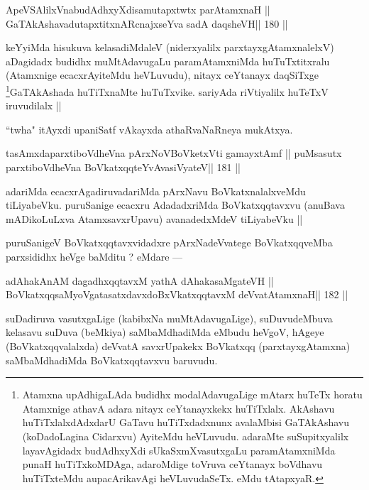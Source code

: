 \begin{shl}
ApeVSAlilxVnabudAdhxyXdisamutapxtwtx parAtamxnaH ||
GaTAkAshavadutapxtitxnARcnajxseYva sadA daqsheVH\hfill || 180 ||
\end{shl}

\begin{artha}
keYyiMda hisukuva kelasadiMdaleV (niderxyalilx parxtayxgAtamxnalelxV) 
aDagidadx budidhx muMtAdavugaLu paramAtamxniMda huTuTxtitxralu 
(Atamxnige ecacxrAyiteMdu heVLuvudu), nitayx ceYtanayx daqSiTxge 
\footnote[12]{Atamxna upAdhigaLAda budidhx modalAdavugaLige mAtarx 
huTeTx horatu Atamxnige athavA adara nitayx ceYtanayxkekx huTiTxlalx. 
AkAshavu huTiTxlalxdAdxdarU GaTavu huTiTxdadxnunx avalaMbisi 
GaTAkAshavu (koDadoLagina Cidarxvu) AyiteMdu heVLuvudu. adaraMte suSupitxyalilx layavAgidadx budAdhxyXdi sUkaSxmXvasutxgaLu paramAtamxniMda punaH huTiTxkoMDAga, adaroMdige toVruva ceYtanayx boVdhavu huTiTxteMdu aupacArikavAgi heVLuvudaSeTx. eMdu tAtapxyaR.}GaTAkAshada huTiTxnaMte huTuTxvike. sariyAda riVtiyalilx huTeTxV iruvudilalx ||
\end{artha}

\begin{artha}
``twha" itAyxdi upaniSatf vAkayxda athaRvaNaRneya mukAtxya.
\end{artha}

\begin{shl}
tasAmxdaparxtiboVdheVna pArxNoV\s BoVketxVti gamayxtAmf ||
puMsasutx parxtiboVdheVna BoVkatxqqteYvAvasiVyateV\hfill || 181 ||
\end{shl}

\begin{artha}
adariMda ecacxrAgadiruvadariMda pArxNavu BoVkatxnalalxveMdu 
tiLiyabeVku. puruSanige ecacxru AdadadxriMda BoVkatxqqtavxvu (anuBava mADikoLuLxva AtamxsavxrUpavu) avanadedxMdeV tiLiyabeVku ||
\end{artha}

\begin{artha}
puruSanigeV BoVkatxqqtavxvidadxre pArxNadeVvatege BoVkatxqqveMba parxsididhx heVge baMditu ? eMdare ---
\end{artha}

\begin{shl}
adAhakAnAM dagadhxqqtavxM yathA dAhakasaMgateVH ||
BoVkatxqqsaMyoVgatasatxdavxdoBxVkatxqqtavxM deVvatAtamxnaH\hfill || 182 ||
\end{shl}

\begin{artha}
suDadiruva vasutxgaLige (kabibxNa muMtAdavugaLige), suDuvudeMbuva kelasavu suDuva (beMkiya) saMbaMdhadiMda eMbudu heVgoV, hAgeye (BoVkatxqqvalalxda) deVvatA savxrUpakekx BoVkatxqq (parxtayxgAtamxna) saMbaMdhadiMda BoVkatxqqtavxvu baruvudu.
\end{artha}

